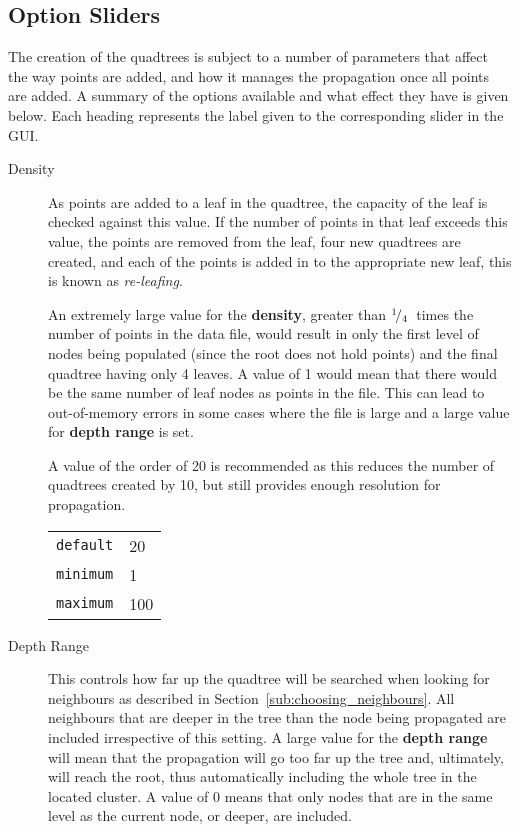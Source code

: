 \subsection{Option Sliders}
\label{sub:option_sliders}

The creation of the quadtrees is subject to a number of parameters that affect
the way points are added, and how it manages the propagation once all points
are added. A summary of the options available and what effect they have is
given below. Each heading represents the label given to the corresponding
slider in the GUI\@.

\begin{description}

	\item[Density] As points are added to a leaf in the quadtree, the capacity
		of the leaf is checked against this value. If the number of points in
		that leaf exceeds this value, the points are removed from the leaf,
		four new quadtrees are created, and each of the points is added in to
		the appropriate new leaf, this is known as \emph{re-leafing}.

		An extremely large value for the \textbf{density}, greater than
		${}^{1}\!/_{4}$~times the number of points in the data file, would
		result in only the first level of nodes being populated (since the root
		does not hold points) and the final quadtree having only 4 leaves. A
		value of 1 would mean that there would be the same number of leaf nodes
		as points in the file. This can lead to out-of-memory errors in some
		cases where the file is large and a large value for \textbf{depth
		range} is set.

		A value of the order of 20 is recommended as this reduces the number of
		quadtrees created by 10, but still provides enough resolution for
		propagation.

		\begin{tabular}{r l}
			\texttt{default} & 20 \\
			\texttt{minimum} & 1 \\
			\texttt{maximum} & 100 \\
		\end{tabular}

	\item[Depth Range] This controls how far up the quadtree will be searched
		when looking for neighbours as described in
		Section~\ref{sub:choosing_neighbours}. All neighbours that are deeper
		in the tree than the node being propagated are included irrespective of
		this setting. A large value for the \textbf{depth range} will mean that
		the propagation will go too far up the tree and, ultimately, will reach
		the root, thus automatically including the whole tree in the located
		cluster. A value of 0 means that only nodes that are in the same level
		as the current node, or deeper, are included.


\end{description}
